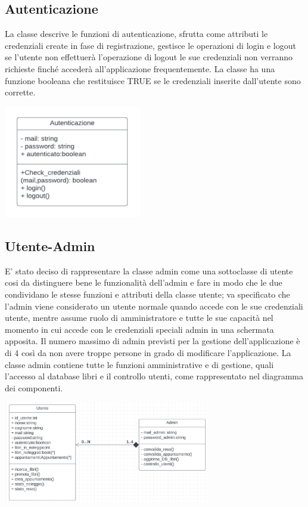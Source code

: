 \documentclass{article}
\begin{document}
\subsection{Autenticazione}
La classe descrive le funzioni di autenticazione, sfrutta come attributi le credenziali create in fase di registrazione, gestisce le operazioni di login e logout se l’utente non effettuerà l’operazione di logout le sue credenziali non verranno richieste finché accederà all’applicazione frequentemente. La classe ha una funzione booleana che restituisce TRUE  se le credenziali inserite dall’utente sono corrette.
\begin{center}
        \includegraphics[width=60mm]{D3/Images/autenticazione.png}
\end{center}

\subsection{Utente-Admin} 
E’ stato deciso di rappresentare la classe admin come una sottoclasse di utente cosi da distinguere bene le funzionalità dell’admin e fare in modo che le due condividano le stesse funzioni e attributi della classe utente; va specificato che l’admin viene considerato un utente normale quando accede con le sue credenziali utente, mentre assume ruolo di amministratore e tutte le sue capacità nel momento in cui accede con le credenziali speciali admin in una schermata apposita. Il numero massimo di admin previsti per la gestione dell'applicazione è di 4 così da non avere troppe persone in grado di modificare l’applicazione. La classe admin contiene tutte le funzioni amministrative e di gestione, quali l’accesso al database libri e il controllo utenti, come rappresentato nel diagramma dei componenti.
\begin{center}
        \includegraphics[width=90mm]{D3/Images/UtenteAdmin.png}
\end{center}
\end{document}
